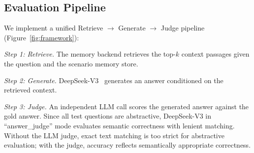 \begin{table}[t]
\centering
{}
\caption{Scenario type distribution by data source. Real-source scenarios concentrate on entity evolution, multi-source information, and temporal ambiguity; LLM-generated scenarios cover rare types with no natural real-world data.}
\label{tab:scenario_dist}
\end{table}

\subsection{Evaluation Pipeline}
We implement a unified Retrieve $\rightarrow$ Generate $\rightarrow$ Judge pipeline (Figure~\ref{fig:framework}):

\textit{Step 1: Retrieve.} The memory backend retrieves the top-$k$ context passages given the question and the scenario memory store.

\textit{Step 2: Generate.} DeepSeek-V3~\citep{deepseekv3} generates an answer conditioned on the retrieved context.

\textit{Step 3: Judge.} An independent LLM call scores the generated answer against the gold answer. Since all test questions are abstractive, DeepSeek-V3 in ``answer\_judge'' mode evaluates semantic correctness with lenient matching. Without the LLM judge, exact text matching is too strict for abstractive evaluation; with the judge, accuracy reflects semantically appropriate correctness.
